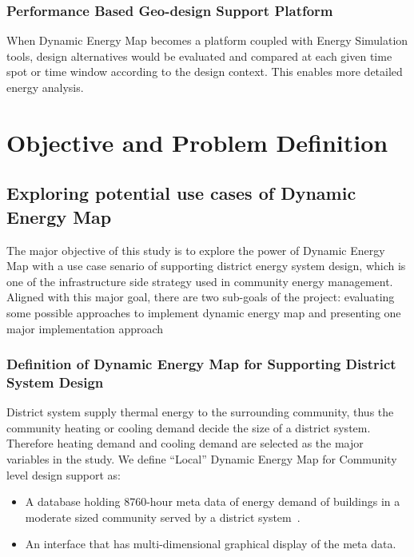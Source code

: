 \documentclass[hidelinks,12pt]{article}
\begin{document}
\subsubsection{Performance Based Geo-design Support Platform}
When Dynamic Energy Map becomes a platform coupled with Energy
Simulation tools, design alternatives would be evaluated and compared
at each given time spot or time window according to the design
context. This enables more detailed energy analysis.
\newpage
\section{Objective and Problem Definition}
\subsection{Exploring potential use cases of Dynamic Energy Map}
The major objective of this study is to explore the power of Dynamic
Energy Map with a use case senario of supporting district energy
system design, which is one of the infrastructure side strategy used
in community energy management. Aligned with this major goal, there
are two sub-goals of the project: evaluating some possible approaches
to implement dynamic energy map and presenting one major
implementation approach

\subsubsection{Definition of Dynamic Energy Map for Supporting
  District System Design}
District system supply thermal energy to the surrounding community,
thus the community heating or cooling demand decide the size of a
district system. Therefore heating demand and cooling demand are
selected as the major variables in the study. We define ``Local''
Dynamic Energy Map for Community level design support as:
\begin{itemize}
\item A database holding 8760-hour meta data of energy demand of
  buildings in a moderate sized community served by a district
  system~\cite{baird2014}.
\item An interface that has multi-dimensional graphical display of the
  meta data.
\end{itemize}
\end{document}
